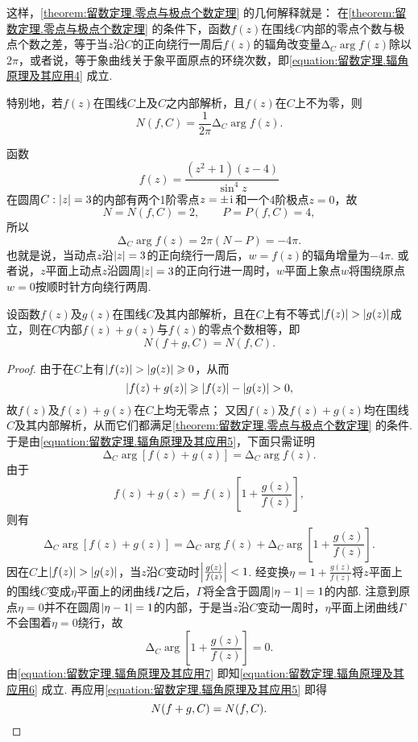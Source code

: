 这样，\cref{theorem:留数定理.零点与极点个数定理} 的几何解释就是：
在\cref{theorem:留数定理.零点与极点个数定理} 的条件下，函数\(f(z)\)在围线\(C\)内部的零点个数与极点个数之差，等于当\(z\)沿\(C\)的正向绕行一周后\(f(z)\)的辐角改变量\(\increment_C \arg f(z)\)除以\(2\pi\)，或者说，等于象曲线关于象平面原点的环绕次数，即\cref{equation:留数定理.辐角原理及其应用4} 成立.

特别地，若\(f(z)\)在围线\(C\)上及\(C\)之内部解析，且\(f(z)\)在\(C\)上不为零，则\begin{equation}\label{equation:留数定理.辐角原理及其应用5}
N(f,C) = \frac{1}{2\pi} \increment_C \arg f(z).
\end{equation}

\begin{example}
函数\[
f(z) = \frac{(z^2+1)(z-4)}{\sin^4 z}
\]在圆周\(C: \abs{z}=3\)的内部有两个1阶零点\(z=\pm\kern1pt\mathrm{i}\kern1pt\)和一个4阶极点\(z=0\)，故\[
N=N(f,C)=2, \qquad P=P(f,C)=4,
\]所以\[
\increment_C \arg f(z) = 2\pi(N - P) = -4\pi.
\]也就是说，当动点\(z\)沿\(\abs{z}=3\)的正向绕行一周后，\(w = f(z)\)的辐角增量为\(-4\pi\).
或者说，\(z\)平面上动点\(z\)沿圆周\(\abs{z}=3\)的正向行进一周时，\(w\)平面上象点\(w\)将围绕原点\(w=0\)按顺时针方向绕行两周.
\end{example}

\begin{theorem}[儒歇定理]
设函数\(f(z)\)及\(g(z)\)在围线\(C\)及其内部解析，且在\(C\)上有不等式\(\abs{f(z)}>\abs{g(z)}\)成立，则在\(C\)内部\(f(z)+g(z)\)与\(f(z)\)的零点个数相等，即\[
N(f+g,C) = N(f,C).
\]
\begin{proof}
由于在\(C\)上有\(\abs{f(z)}>\abs{g(z)}\geqslant0\)，从而\[
\abs{f(z)+g(z)}\geqslant\abs{f(z)}-\abs{g(z)}>0,
\]故\(f(z)\)及\(f(z)+g(z)\)在\(C\)上均无零点；
又因\(f(z)\)及\(f(z)+g(z)\)均在围线\(C\)及其内部解析，从而它们都满足\cref{theorem:留数定理.零点与极点个数定理} 的条件.
于是由\cref{equation:留数定理.辐角原理及其应用5}，下面只需证明\begin{equation}\label{equation:留数定理.辐角原理及其应用6}
\increment_C \arg[f(z)+g(z)] = \increment_C \arg f(z).
\end{equation}
由于\[
f(z)+g(z) = f(z) \left[1+\frac{g(z)}{f(z)}\right],
\]则有\begin{equation}\label{equation:留数定理.辐角原理及其应用7}
\increment_C \arg[f(z)+g(z)] = \increment_C \arg f(z) + \increment_C \arg\left[1+\frac{g(z)}{f(z)}\right].
\end{equation}
因在\(C\)上\(\abs{f(z)}>\abs{g(z)}\)，当\(z\)沿\(C\)变动时\(\abs{\frac{g(z)}{f(z)}}<1\).
经变换\(\eta=1+\frac{g(z)}{f(z)}\)将\(z\)平面上的围线\(C\)变成\(\eta\)平面上的闭曲线\(\Gamma\)之后，\(\Gamma\)将全含于圆周\(\abs{\eta-1}=1\)的内部.
注意到原点\(\eta=0\)并不在圆周\(\abs{\eta-1}=1\)的内部，于是当\(z\)沿\(C\)变动一周时，\(\eta\)平面上闭曲线\(\Gamma\)不会围着\(\eta=0\)绕行，故\[
\increment_C \arg\left[1+\frac{g(z)}{f(z)}\right] = 0.
\]
由\cref{equation:留数定理.辐角原理及其应用7} 即知\cref{equation:留数定理.辐角原理及其应用6} 成立.
再应用\cref{equation:留数定理.辐角原理及其应用5} 即得\[
N(f+g,C) = N(f,C).
\qedhere
\]
\end{proof}
\end{theorem}

